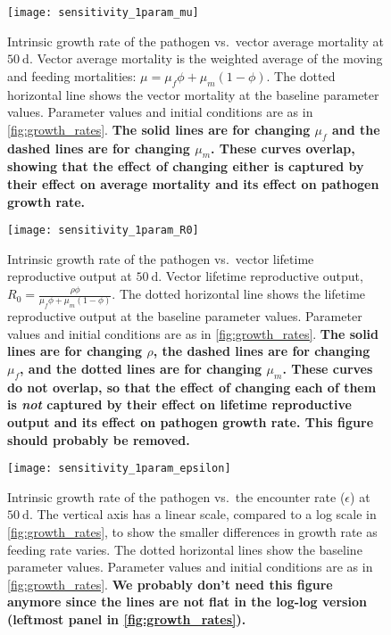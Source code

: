 \documentclass{article}
\newcommand{\comment}[1]{\textbf{#1}}
\begin{document}
\begin{figure}
  \centering
  \texttt{[image: sensitivity\_1param\_mu]}
  \caption{Intrinsic growth rate of the pathogen vs.~vector average
    mortality at $50~\text{d}$.  Vector average mortality is the
    weighted average of the moving and feeding mortalities: $\mu =
    \mu_f \phi + \mu_m (1 - \phi)$.  The dotted horizontal
    line shows the vector mortality at the baseline parameter values.
    Parameter values and initial conditions are as in
    \autoref{fig:growth_rates}.  \comment{The solid lines are for
      changing $\mu_f$ and the dashed lines are for changing
      $\mu_m$.  These curves overlap, showing that the effect of
      changing either is captured by their effect on average mortality
      and its effect on pathogen growth rate.}}
  \label{fig:sensitivity_1param_mu}
\end{figure}

\begin{figure}
  \centering
  \texttt{[image: sensitivity\_1param\_R0]}
  \caption{Intrinsic growth rate of the pathogen vs.~vector lifetime
    reproductive output at $50~\text{d}$.  Vector lifetime
    reproductive output, $R_0 = \frac{\rho \phi}{\mu_f \phi +
      \mu_m (1 - \phi)}$.  The dotted horizontal line shows the
    lifetime reproductive output at the baseline parameter values.
    Parameter values and initial conditions are as in
    \autoref{fig:growth_rates}.  \comment{The solid lines are for
      changing $\rho$, the dashed lines are for changing $\mu_f$,
      and the dotted lines are for changing $\mu_m$.  These curves
      do not overlap, so that the effect of
      changing each of them is \emph{not} captured by their effect on
      lifetime reproductive output and its effect on pathogen growth
      rate.  This figure should probably be removed.}}
  \label{fig:sensitivity_1param_R0}
\end{figure}

\begin{figure}
  \centering
  \texttt{[image: sensitivity\_1param\_epsilon]}
  \caption{Intrinsic growth rate of the pathogen vs.~the encounter
    rate ($\epsilon$) at $50~\text{d}$.  The vertical axis has a linear scale,
    compared to a log scale in \autoref{fig:growth_rates}, to show the
    smaller differences in growth rate as feeding rate varies.  The
    dotted horizontal lines show the baseline parameter values.
    Parameter values and initial conditions are as in
    \autoref{fig:growth_rates}.  \comment{We probably don't need this
      figure anymore since the lines are not flat in the log-log
      version (leftmost panel in \autoref{fig:growth_rates}).}}
  \label{fig:sensitivity_1param_epsilon}
\end{figure}
\end{document}
